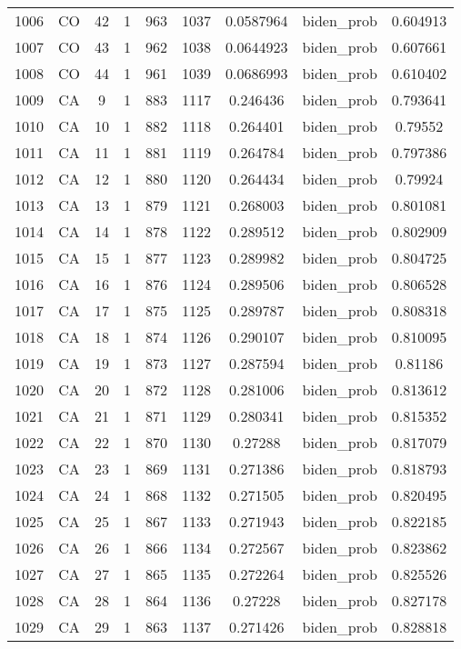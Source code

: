 \documentclass[12pt,a4paper]{article}
\begin{document}
\begin{tabular}{r|cccccccc}
	1006 & CO & 42 & 1 & 963 & 1037 & 0.0587964 & biden\_prob & 0.604913 \\
	1007 & CO & 43 & 1 & 962 & 1038 & 0.0644923 & biden\_prob & 0.607661 \\
	1008 & CO & 44 & 1 & 961 & 1039 & 0.0686993 & biden\_prob & 0.610402 \\
	1009 & CA & 9 & 1 & 883 & 1117 & 0.246436 & biden\_prob & 0.793641 \\
	1010 & CA & 10 & 1 & 882 & 1118 & 0.264401 & biden\_prob & 0.79552 \\
	1011 & CA & 11 & 1 & 881 & 1119 & 0.264784 & biden\_prob & 0.797386 \\
	1012 & CA & 12 & 1 & 880 & 1120 & 0.264434 & biden\_prob & 0.79924 \\
	1013 & CA & 13 & 1 & 879 & 1121 & 0.268003 & biden\_prob & 0.801081 \\
	1014 & CA & 14 & 1 & 878 & 1122 & 0.289512 & biden\_prob & 0.802909 \\
	1015 & CA & 15 & 1 & 877 & 1123 & 0.289982 & biden\_prob & 0.804725 \\
	1016 & CA & 16 & 1 & 876 & 1124 & 0.289506 & biden\_prob & 0.806528 \\
	1017 & CA & 17 & 1 & 875 & 1125 & 0.289787 & biden\_prob & 0.808318 \\
	1018 & CA & 18 & 1 & 874 & 1126 & 0.290107 & biden\_prob & 0.810095 \\
	1019 & CA & 19 & 1 & 873 & 1127 & 0.287594 & biden\_prob & 0.81186 \\
	1020 & CA & 20 & 1 & 872 & 1128 & 0.281006 & biden\_prob & 0.813612 \\
	1021 & CA & 21 & 1 & 871 & 1129 & 0.280341 & biden\_prob & 0.815352 \\
	1022 & CA & 22 & 1 & 870 & 1130 & 0.27288 & biden\_prob & 0.817079 \\
	1023 & CA & 23 & 1 & 869 & 1131 & 0.271386 & biden\_prob & 0.818793 \\
	1024 & CA & 24 & 1 & 868 & 1132 & 0.271505 & biden\_prob & 0.820495 \\
	1025 & CA & 25 & 1 & 867 & 1133 & 0.271943 & biden\_prob & 0.822185 \\
	1026 & CA & 26 & 1 & 866 & 1134 & 0.272567 & biden\_prob & 0.823862 \\
	1027 & CA & 27 & 1 & 865 & 1135 & 0.272264 & biden\_prob & 0.825526 \\
	1028 & CA & 28 & 1 & 864 & 1136 & 0.27228 & biden\_prob & 0.827178 \\
	1029 & CA & 29 & 1 & 863 & 1137 & 0.271426 & biden\_prob & 0.828818 \\

\end{tabular}
\end{document}
